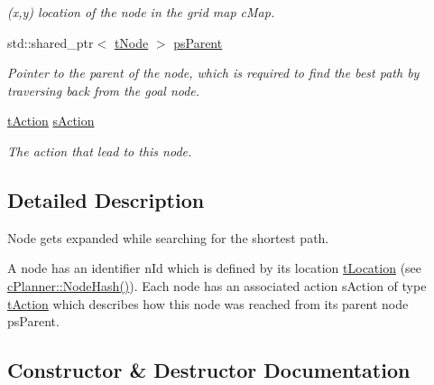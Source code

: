 \begin{DoxyCompactItemize}
\begin{DoxyCompactList}\small\item\em (x,y) location of the node in the grid map c\+Map. \end{DoxyCompactList}\item 
\mbox{\label{structplanner_1_1t_node_a626d33dc40af6be79e975d54200d77e8}} 
std\+::shared\+\_\+ptr$<$ \mbox{\hyperlink{structplanner_1_1t_node}{t\+Node}} $>$ \mbox{\hyperlink{structplanner_1_1t_node_a626d33dc40af6be79e975d54200d77e8}{ps\+Parent}}
\begin{DoxyCompactList}\small\item\em Pointer to the parent of the node, which is required to find the best path by traversing back from the goal node. \end{DoxyCompactList}\item 
\mbox{\label{structplanner_1_1t_node_ad64b2f4aead654e8e187a9bbb0be483c}} 
\mbox{\hyperlink{structplanner_1_1t_action}{t\+Action}} \mbox{\hyperlink{structplanner_1_1t_node_ad64b2f4aead654e8e187a9bbb0be483c}{s\+Action}}
\begin{DoxyCompactList}\small\item\em The action that lead to this node. \end{DoxyCompactList}\end{DoxyCompactItemize}


\subsection{Detailed Description}
Node gets expanded while searching for the shortest path. 

A node has an identifier n\+Id which is defined by its location \mbox{\hyperlink{structplanner_1_1t_location}{t\+Location}} (see \mbox{\hyperlink{classplanner_1_1c_planner_a4c99873ce64b214899d65eda6366455f}{c\+Planner\+::\+Node\+Hash()}}). Each node has an associated action s\+Action of type \mbox{\hyperlink{structplanner_1_1t_action}{t\+Action}} which describes how this node was reached from its parent node ps\+Parent. 

\subsection{Constructor \& Destructor Documentation}
\mbox{\label{structplanner_1_1t_node_a83ff217ef060b93698045b2357999594}} 
